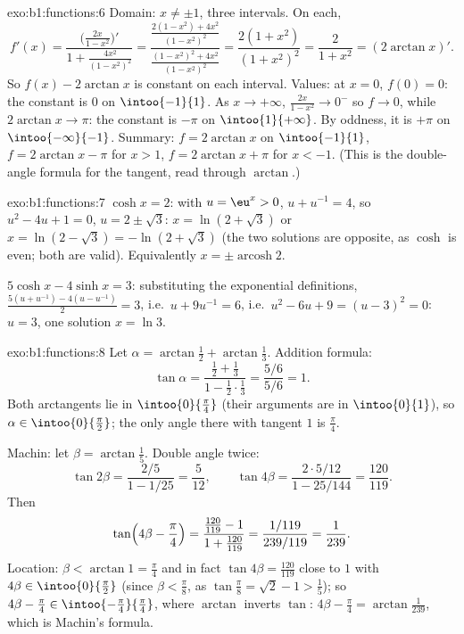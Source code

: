 \begin{solution}{exo:b1:functions:6}
Domain: $x \neq \pm 1$, three intervals. On each,
\[
f'(x) = \frac{\bigl(\frac{2x}{1-x^2}\bigr)'}{1 +
\frac{4x^2}{(1-x^2)^2}}
= \frac{\frac{2(1-x^2) + 4x^2}{(1-x^2)^2}}
{\frac{(1-x^2)^2 + 4x^2}{(1-x^2)^2}}
= \frac{2(1 + x^2)}{(1 + x^2)^2} = \frac{2}{1 + x^2}
= (2\arctan x)' .
\]
So $f(x) - 2\arctan x$ is constant on each interval. Values: at $x =
0$, $f(0) = 0$: the constant is $0$ on $\intoo{-1}{1}$. As $x \to
+\infty$, $\frac{2x}{1-x^2} \to 0^-$ so $f \to 0$, while $2\arctan x
\to \pi$: the constant is $-\pi$ on $\intoo{1}{+\infty}$. By oddness,
it is $+\pi$ on $\intoo{-\infty}{-1}$. Summary: $f = 2\arctan x$ on
$\intoo{-1}{1}$, $f = 2\arctan x - \pi$ for $x > 1$, $f = 2\arctan x +
\pi$ for $x < -1$. (This is the double-angle formula for the tangent,
read through $\arctan$.)
\end{solution}

\begin{solution}{exo:b1:functions:7}
$\cosh x = 2$: with $u = \eu^x > 0$, $u + u^{-1} = 4$, so $u^2 - 4u +
1 = 0$, $u = 2 \pm \sqrt 3$: $x = \ln(2 + \sqrt 3)$ or $x = \ln(2 -
\sqrt 3) = -\ln(2 + \sqrt 3)$ (the two solutions are opposite, as
$\cosh$ is even; both are valid). Equivalently $x = \pm
\operatorname{arcosh} 2$.

$5\cosh x - 4\sinh x = 3$: substituting the exponential definitions,
$\frac{5(u + u^{-1}) - 4(u - u^{-1})}{2} = 3$, i.e.\ $u + 9u^{-1} =
6$, i.e.\ $u^2 - 6u + 9 = (u - 3)^2 = 0$: $u = 3$, one solution $x =
\ln 3$.
\end{solution}

\begin{solution}{exo:b1:functions:8}
Let $\alpha = \arctan\frac12 + \arctan\frac13$. Addition formula:
\[
\tan\alpha = \frac{\frac12 + \frac13}{1 - \frac12\cdot\frac13}
= \frac{5/6}{5/6} = 1 .
\]
Both arctangents lie in $\intoo{0}{\frac\pi4}$ (their arguments are in
$\intoo{0}{1}$), so $\alpha \in \intoo{0}{\frac\pi2}$; the only angle
there with tangent $1$ is $\frac\pi4$.

Machin: let $\beta = \arctan\frac15$. Double angle twice:
\[
\tan 2\beta = \frac{2/5}{1 - 1/25} = \frac{5}{12},
\qquad
\tan 4\beta = \frac{2 \cdot 5/12}{1 - 25/144} = \frac{120}{119}.
\]
Then
\[
\tan\Bigl(4\beta - \frac\pi4\Bigr)
= \frac{\frac{120}{119} - 1}{1 + \frac{120}{119}}
= \frac{1/119}{239/119} = \frac{1}{239}.
\]
Location: $\beta < \arctan 1 = \frac\pi4$ and in fact $\tan 4\beta =
\frac{120}{119}$ close to $1$ with $4\beta \in \intoo{0}{\frac\pi2}$
(since $\beta < \frac\pi8$, as $\tan\frac\pi8 = \sqrt 2 - 1 > \frac15$);
so $4\beta - \frac\pi4 \in \intoo{-\frac\pi4}{\frac\pi4}$, where
$\arctan$ inverts $\tan$: $4\beta - \frac\pi4 =
\arctan\frac{1}{239}$, which is Machin's formula.
\end{solution}

